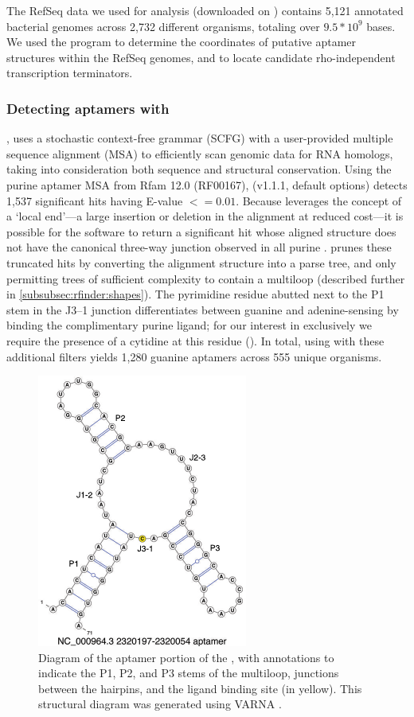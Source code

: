 The RefSeq data we used for analysis (downloaded on \fnaRetrievalTime)
contains 5,121 annotated bacterial genomes
across 2,732 different organisms, totaling over $9.5 * 10^9$ bases. We used the
program \infernal to determine the coordinates of putative aptamer structures
within the RefSeq genomes, and \tthp to locate candidate rho-independent
transcription terminators.

\subsubsection{Detecting aptamers with \infernal}
\label{subsubsec:rfinder:infernal}

\infernal \citep{infernal}, \citep{nawrocki:2013hk} uses a stochastic context-free
grammar (SCFG) with a user-provided multiple sequence alignment (MSA) to
efficiently scan genomic data for RNA homologs, taking into consideration both
sequence and structural conservation. Using the purine aptamer MSA from Rfam 12.0
(RF00167), \infernal (v1.1.1, default options) detects 1,537 significant hits
having E-value $<= 0.01$. Because \infernal leverages the concept of a
`local end'---a large insertion or deletion in the alignment at reduced cost---it
is possible for the software to return a significant hit whose aligned structure
does not have the canonical three-way junction observed in all purine
\rbs. \rfinder prunes these truncated \infernal hits by converting the
alignment structure into a parse tree, and only permitting trees of sufficient
complexity to contain a multiloop (described further in
\ref{subsubsec:rfinder:shapes}). The pyrimidine residue abutted next to the P1
stem in the J3--1 junction differentiates between guanine and adenine-sensing
\rbs by binding the complimentary purine ligand; for our interest in \grbs
exclusively we require the presence of a cytidine at this residue
(). In total, using
\infernal with these additional filters yields 1,280 guanine aptamers across 555
unique organisms.

\begin{figure}[!ht]
\centering
\includegraphics[width=.4\textwidth]{Figures/Ribofinder/NC_000964_3_2320197_2320054_APTAMER.pdf}
\caption[Diagram of the aptamer portion of the \Bsxpt \grb]{Diagram of the aptamer portion of the \Bsxpt \grb, with annotations
to indicate the P1, P2, and P3 stems of the multiloop, junctions between the
hairpins, and the ligand binding site (in yellow). This structural diagram was
generated using VARNA \citep{darty:2009gt}.}
\label{fig:rfinder:aptamerDiagram}
\end{figure}

